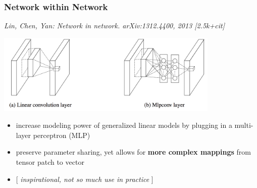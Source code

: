 \documentclass[compress]{beamer}
\newcommand{\textbblue}[1]{{\bf\color{Blue} #1}}
\newcommand{\is}[1]{\setlength{\itemsep}{#1}}
\begin{document}
\begin{frame} \frametitle{Network within Network}
{\small \textit{Lin, Chen, Yan: Network in network. arXiv:1312.4400, 2013 [2.5k+cit]}}
\begin{center}
\includegraphics[width=0.8\textwidth]{./figures/netinnet.png}
\end{center}

\begin{itemize} \is{2mm}
\item increase modeling power of generalized linear models by plugging in a multi-layer perceptron (MLP) 
\item preserve parameter sharing, yet allows for \textbblue{more complex mappings} from tensor patch to vector
\item {[ \textit{inspirational, not so much use in practice} ]}
\end{itemize}
\end{frame}
\end{document}
